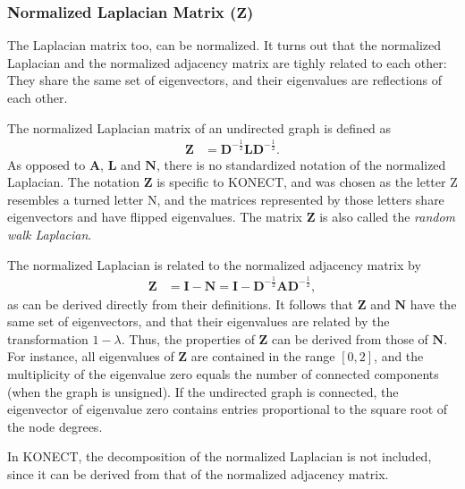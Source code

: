 \documentclass{article}
\begin{document}
\subsubsection{Normalized Laplacian Matrix ($\mathbf Z$)}
\label{sec:matrix.Z}
The Laplacian matrix too, can be normalized.  It turns out that the
normalized Laplacian and the normalized adjacency matrix
are tighly related
to each other:  They share the same set of eigenvectors, and their
eigenvalues are reflections of each other.  

The normalized Laplacian matrix of an undirected graph is defined as 
\begin{align}
  \mathbf Z &= \mathbf D^{-\frac 1 2} \mathbf L \mathbf D^{-\frac 1 2}.
\end{align}
As opposed to $\mathbf A$, $\mathbf L$ and $\mathbf N$, there is no
standardized notation of the normalized Laplacian.  The notation
$\mathbf Z$ is specific to KONECT, and was chosen as the letter Z
resembles a turned letter N, and the matrices represented by those
letters share eigenvectors and have flipped eigenvalues. 
The matrix $\mathbf Z$ is also called the \emph{random walk Laplacian}. 

The normalized Laplacian is related to the normalized adjacency matrix
by 
\begin{align}
  \mathbf Z &= \mathbf I - \mathbf N = \mathbf I - \mathbf D^{-\frac 1 2}
  \mathbf A \mathbf D^{-\frac 1 2}, 
\end{align}
as can be derived directly from their definitions. 
It follows that $\mathbf Z$ and $\mathbf N$ have the same set of
eigenvectors, and that their eigenvalues are related by the
transformation $1 - \lambda$. Thus, the properties of $\mathbf Z$ can be
derived from those of $\mathbf N$. For instance, all eigenvalues of
$\mathbf Z$ are contained in the range $[0, 2]$, and the multiplicity of
the eigenvalue zero equals the number of connected components (when the
graph is unsigned). If the undirected graph is connected, the eigenvector of
eigenvalue zero contains entries proportional to the square root of the
node degrees. 

In KONECT, the decomposition of the normalized Laplacian is not
included, since it can be derived from that of the normalized adjacency
matrix. 
\end{document}

